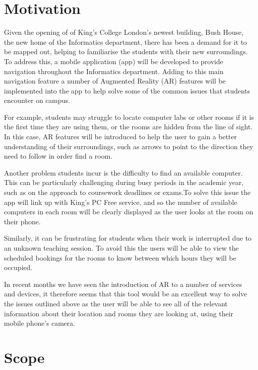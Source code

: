 \section{Motivation}
\label{sec:motivation}

Given the opening of of King's College London's newest building, Bush House, the new home of the Informatics department, there has been a demand for it to be mapped out, helping to familiarise the students with their new surroundings. To address this, a mobile application (app) will be developed to provide navigation throughout the Informatics department. Adding to this main navigation feature a number of Augmented Reality (AR) features will be implemented into the app to help solve some of the common issues that students encounter on campus.

For example, students may struggle to locate computer labs or other rooms if it is the first time they are using them, or the rooms are hidden from the line of sight. In this case, AR features will be introduced to help the user to gain a better understanding of their surroundings, such as arrows to point to the direction they need to follow in order find a room.

Another problem students incur is the difficulty to find an available computer. This can be particularly challenging during busy periods in the academic year, such as on the approach to coursework deadlines or exams.To solve this issue the app will link up with King's PC Free service, and so the number of available computers in each room will be clearly displayed as the user looks at the room on their phone.

Similarly, it can be frustrating for students when their work is interrupted due to an unknown teaching session.  To avoid this the users will be able to view the scheduled bookings for the rooms to know between which hours they will be occupied.

In recent months we have seen the introduction of AR to a number of services and devices, it therefore seems that this tool would be an excellent way to solve the issues  outlined above as the user will be able to see all of the relevant information about their location and rooms they are looking at, using their mobile phone's camera.

\section{Scope}
\label{sec:scope}

